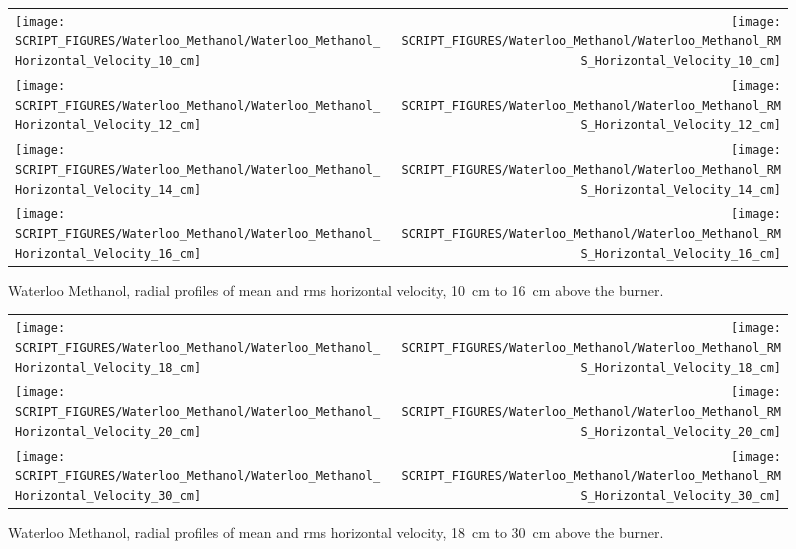 \begin{figure}[p]
\begin{tabular*}{\textwidth}{l@{\extracolsep{\fill}}r}
\texttt{[image: SCRIPT\_FIGURES/Waterloo\_Methanol/Waterloo\_Methanol\_Horizontal\_Velocity\_10\_cm]} &
\texttt{[image: SCRIPT\_FIGURES/Waterloo\_Methanol/Waterloo\_Methanol\_RMS\_Horizontal\_Velocity\_10\_cm]} \\
\texttt{[image: SCRIPT\_FIGURES/Waterloo\_Methanol/Waterloo\_Methanol\_Horizontal\_Velocity\_12\_cm]} &
\texttt{[image: SCRIPT\_FIGURES/Waterloo\_Methanol/Waterloo\_Methanol\_RMS\_Horizontal\_Velocity\_12\_cm]} \\
\texttt{[image: SCRIPT\_FIGURES/Waterloo\_Methanol/Waterloo\_Methanol\_Horizontal\_Velocity\_14\_cm]} &
\texttt{[image: SCRIPT\_FIGURES/Waterloo\_Methanol/Waterloo\_Methanol\_RMS\_Horizontal\_Velocity\_14\_cm]} \\
\texttt{[image: SCRIPT\_FIGURES/Waterloo\_Methanol/Waterloo\_Methanol\_Horizontal\_Velocity\_16\_cm]} &
\texttt{[image: SCRIPT\_FIGURES/Waterloo\_Methanol/Waterloo\_Methanol\_RMS\_Horizontal\_Velocity\_16\_cm]}
\end{tabular*}
\caption[Waterloo Methanol, radial mean and rms horz.~vel., 10~cm to 16~cm above burner]
{Waterloo Methanol, radial profiles of mean and rms horizontal velocity, 10~cm to 16~cm above the burner.}
\label{Water_Methanol_Hori_Vel_2}
\end{figure}

\begin{figure}[p]
\begin{tabular*}{\textwidth}{l@{\extracolsep{\fill}}r}
\texttt{[image: SCRIPT\_FIGURES/Waterloo\_Methanol/Waterloo\_Methanol\_Horizontal\_Velocity\_18\_cm]} &
\texttt{[image: SCRIPT\_FIGURES/Waterloo\_Methanol/Waterloo\_Methanol\_RMS\_Horizontal\_Velocity\_18\_cm]} \\
\texttt{[image: SCRIPT\_FIGURES/Waterloo\_Methanol/Waterloo\_Methanol\_Horizontal\_Velocity\_20\_cm]} &
\texttt{[image: SCRIPT\_FIGURES/Waterloo\_Methanol/Waterloo\_Methanol\_RMS\_Horizontal\_Velocity\_20\_cm]} \\
\texttt{[image: SCRIPT\_FIGURES/Waterloo\_Methanol/Waterloo\_Methanol\_Horizontal\_Velocity\_30\_cm]} &
\texttt{[image: SCRIPT\_FIGURES/Waterloo\_Methanol/Waterloo\_Methanol\_RMS\_Horizontal\_Velocity\_30\_cm]}
\end{tabular*}
\caption[Waterloo Methanol, radial mean and rms horz.~vel., 18~cm to 30~cm above burner]
{Waterloo Methanol, radial profiles of mean and rms horizontal velocity, 18~cm to 30~cm above the burner.}
\label{Water_Methanol_Hori_Vel_3}
\end{figure}


